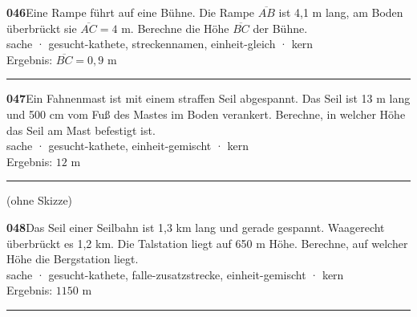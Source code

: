 \documentclass[10pt]{article}
\begin{document}
\begin{minipage}[t]{\linewidth}
\parbox[t]{5.8cm}{}\hfill\parbox[t]{11.6cm}{\textbf{046}\quad Eine Rampe führt auf eine Bühne. Die Rampe $\overline{AB}$ ist 4,1 m lang, am Boden überbrückt sie $\overline{AC} = 4$ m. Berechne die Höhe $\overline{BC}$ der Bühne.\\[2pt]{\color{gray}\footnotesize sache · gesucht-kathete, streckennamen, einheit-gleich · kern\\Ergebnis: $\overline{BC} = 0{,}9$ m}}
\end{minipage}\par\medskip\hrule\medskip
\begin{minipage}[t]{\linewidth}
\parbox[t]{5.8cm}{}\hfill\parbox[t]{11.6cm}{\textbf{047}\quad Ein Fahnenmast ist mit einem straffen Seil abgespannt. Das Seil ist 13 m lang und 500 cm vom Fuß des Mastes im Boden verankert. Berechne, in welcher Höhe das Seil am Mast befestigt ist.\\[2pt]{\color{gray}\footnotesize sache · gesucht-kathete, einheit-gemischt · kern\\Ergebnis: $12$ m}}
\end{minipage}\par\medskip\hrule\medskip
\begin{minipage}[t]{\linewidth}
\parbox[t]{5.8cm}{\parbox[t]{5.5cm}{\color{gray}\small (ohne Skizze)}}\hfill\parbox[t]{11.6cm}{\textbf{048}\quad Das Seil einer Seilbahn ist 1,3 km lang und gerade gespannt. Waagerecht überbrückt es 1,2 km. Die Talstation liegt auf 650 m Höhe. Berechne, auf welcher Höhe die Bergstation liegt.\\[2pt]{\color{gray}\footnotesize sache · gesucht-kathete, falle-zusatzstrecke, einheit-gemischt · kern\\Ergebnis: $1150$ m}}
\end{minipage}\par\medskip\hrule\medskip
\end{document}
